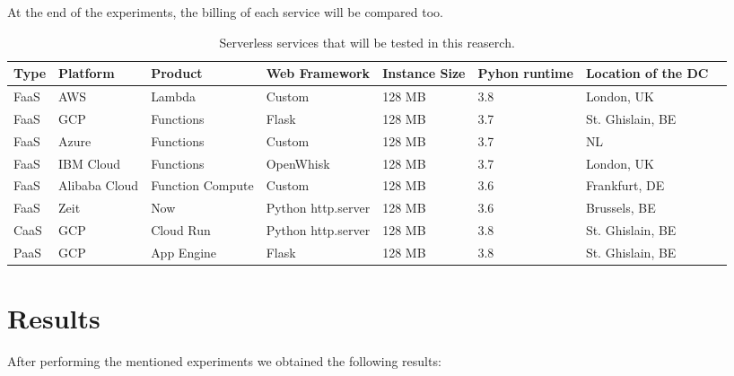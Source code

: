 \documentclass[11pt]{article}
\begin{document}
At the end of the experiments, the billing of each service will be compared too.







\begin{table}
\centering
 \begin{tabularx}{1\textwidth}{X X X X X X X X}
 \textbf{Type} & \textbf{Platform} & \textbf{Product} & \textbf{Web Framework} & \textbf{Instance Size} & \textbf{Pyhon runtime} & \textbf{Location of the DC} \\
 \hline
 \hline
 FaaS & AWS & Lambda & Custom & 128 MB & 3.8 & London, UK \\
 \hline
 FaaS & GCP & Functions & Flask & 128 MB & 3.7 & St. Ghislain, BE \\
 \hline
 FaaS & Azure & Functions & Custom & 128 MB & 3.7 & NL \\
 \hline
 FaaS & IBM Cloud & Functions & OpenWhisk & 128 MB & 3.7 & London, UK\\
 \hline
 FaaS & Alibaba Cloud & Function Compute & Custom & 128 MB & 3.6 & Frankfurt, DE\\
 \hline
 FaaS & Zeit & Now & Python http.server  & 128 MB & 3.6 & Brussels, BE\\
 \hline
 CaaS & GCP & Cloud Run & Python http.server & 128 MB & 3.8 & St. Ghislain, BE\\
 \hline
 PaaS & GCP & App Engine & Flask & 128 MB & 3.8 & St. Ghislain, BE\\

\end{tabularx}
\caption{Serverless services that will be tested in this reaserch.}
\label{Tab:services}

\end{table}

 




\section{Results}
After performing the mentioned experiments we obtained the following results:

\end{document}
